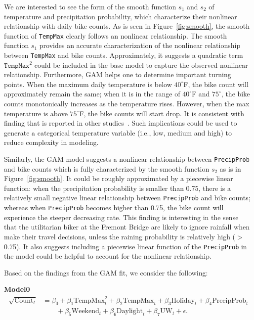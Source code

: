 \documentclass [11pt, proquest] {uwthesis}[2015/03/03]
\begin{document}
We are interested to see the form of the smooth function $s_1$ and $s_2$ of temperature and precipitation probability, which characterize their nonlinear relationship with daily bike counts. As is seen in Figure~\ref{fig:smooth}, the smooth function of \texttt{TempMax} clearly follows an nonlinear relationship. The smooth function $s_1$ provides an accurate characterization of the nonlinear relationship between \texttt{TempMax} and bike counts. Approximately, it suggests a quadratic term $\texttt{TempMax}^2$ could be included in the base model to capture the observed nonlinear relationship. Furthermore, GAM helps one to determine important turning points. When the maximum daily temperature is below $40^{\circ}$F, the bike count will approximately remain the same; when it is in the range of $40^{\circ}$F and $75^{\circ}$, the bike counts monotonically increases as the temperature rises. However, when the max temperature is above $75^{\circ}$F, the bike counts will start drop. It is consistent with finding that is reported in other studies~\cite{Rose07,Richardson00}. Such implications could be used to generate a categorical temperature variable (i.e., low, medium and high) to reduce complexity in modeling.

Similarly, the GAM model suggests a nonlinear relationship between \texttt{PrecipProb} and bike counts which is fully characterized by the smooth function $s_2$ as is in Figure~\ref{fig:smooth}. It could be roughly approximated by a piecewise linear function: when the precipitation probability is smaller than 0.75, there is a relatively small negative linear relationship between \texttt{PrecipProb} and bike counts; whereas when \texttt{PrecipProb} becomes higher than 0.75, the bike count will experience the steeper decreasing rate. This finding is interesting in the sense that the utilitarian biker at the Fremont Bridge are likely to ignore rainfall when make their travel decisions, unless the raining probability is relatively high ($>$0.75). It also suggests including a piecewise linear function of the \texttt{PrecipProb} in the model could be helpful to account for the nonlinear relationship.

Based on the findings from the GAM fit, we consider the following:

\textbf{Model0}
\begin{align}
\sqrt{\text{Count}_t} &= \beta_0 + \beta_1 \text{TempMax}^2_t + \beta_2 \text{TempMax}_t + \beta_3 \text{Holiday}_t + \beta_4 \text{PrecipProb}_t  \nonumber\\
&\qquad + \beta_5 \text{Weekend}_t + \beta_6 \text{Daylight}_t + \beta_7 \text{UW}_t + \epsilon.\label{eqref:model0}
\end{align}
\end{document}
